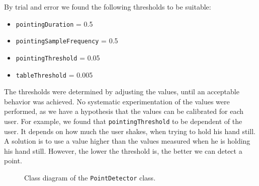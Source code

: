 By trial and error we found the following thresholds to be suitable:

\begin{itemize}
\item \texttt{pointingDuration} = 0.5
\item \texttt{pointingSampleFrequency} = 0.5
\item \texttt{pointingThreshold} = 0.05
\item \texttt{tableThreshold} = 0.005
\end{itemize}

The thresholds were determined by adjusting the values, 
until an acceptable behavior was achieved. 
No systematic experimentation of the values were performed, 
as we have a hypothesis that the values can be calibrated for each user. 
For example, we found that \texttt{pointingThreshold} to be dependent of the user. 
It depends on how much the user shakes, 
when trying to hold his hand still. 
A solution is to use a value higher than the values measured when he is holding his hand still.
However, the lower the threshold is, 
the better we can detect a point.

\begin{figure}
  \centering
  \caption{Class diagram of the \texttt{PointDetector} class.}
  \label{fig:pointdetector-uml}
\end{figure}

